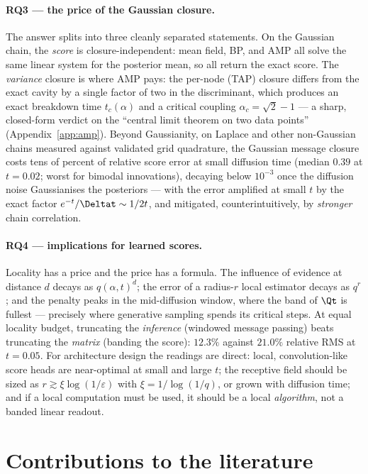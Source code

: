 \paragraph{RQ3 --- the price of the Gaussian closure.} The answer splits
into three cleanly separated statements. On the Gaussian chain, the
\emph{score} is closure-independent: mean field, BP, and AMP all solve the
same linear system for the posterior mean, so all return the exact score.
The \emph{variance} closure is where AMP pays: the per-node (TAP) closure
differs from the exact cavity by a single factor of two in the
discriminant, which produces an exact breakdown time $t_c(\alpha)$ and a
critical coupling $\alpha_c = \sqrt{2} - 1$ --- a sharp, closed-form
verdict on the ``central limit theorem on two data points''
(Appendix~\ref{app:amp}). Beyond
Gaussianity, on Laplace and other non-Gaussian chains measured against
validated grid quadrature, the Gaussian message closure costs tens of
percent of relative score error at small diffusion time (median $0.39$ at
$t = 0.02$; worst for bimodal innovations), decaying below $10^{-3}$ once
the diffusion noise Gaussianises the posteriors --- with the error
amplified at small $t$ by the exact factor $e^{-t}/\Deltat \sim 1/2t$, and
mitigated, counterintuitively, by \emph{stronger} chain correlation.

\paragraph{RQ4 --- implications for learned scores.} Locality has a price
and the price has a formula. The influence of evidence at distance $d$
decays as $q(\alpha,t)^d$; the error of a radius-$r$ local estimator
decays as $q^r$; and the penalty peaks in the mid-diffusion window, where
the band of $\Qt$ is fullest --- precisely where generative sampling
spends its critical steps. At equal locality budget, truncating the
\emph{inference} (windowed message passing) beats truncating the
\emph{matrix} (banding the score): $12.3\%$ against $21.0\%$ relative RMS
at $t = 0.05$. For architecture design the readings are direct: local,
convolution-like score heads are near-optimal at small and large $t$; the
receptive field should be sized as $r \gtrsim \xi \log(1/\varepsilon)$
with $\xi = 1/\log(1/q)$, or grown with diffusion time; and if a local
computation must be used, it should be a local \emph{algorithm}, not a
banded linear readout.

\section{Contributions to the literature}

